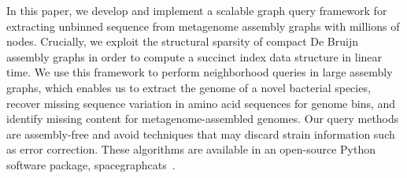 In this paper, we develop and implement a scalable graph query
framework for extracting unbinned sequence from metagenome assembly
graphs with millions of nodes. Crucially, we exploit the structural
sparsity of compact De Bruijn assembly graphs in order to compute a
succinct index data structure in linear time. We use this framework to
perform neighborhood queries in large assembly graphs, which enables
us to extract the genome of a novel bacterial species, recover missing
sequence variation in amino acid sequences for genome bins, and
identify missing content for metagenome-assembled genomes.  Our query
methods are assembly-free and avoid techniques that may discard strain
information such as error correction.  These algorithms are available
in an open-source Python software package,
\textsf{spacegraphcats}~\cite{spacegraphcats}.


